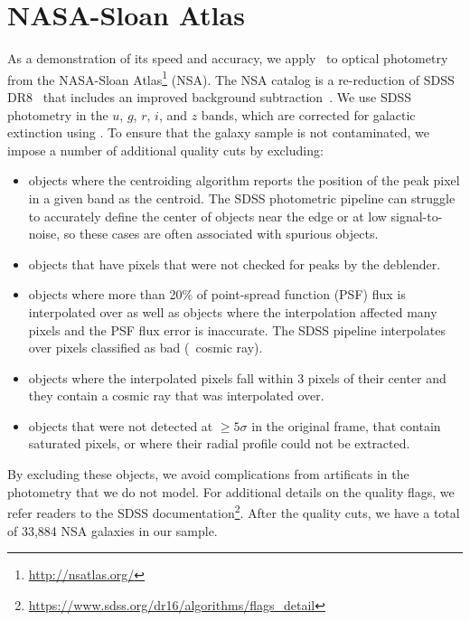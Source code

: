 \section{NASA-Sloan Atlas} \label{sec:obs}
As a demonstration of its speed and accuracy, we apply \sedflow~to optical
photometry from the NASA-Sloan Atlas\footnote{\url{http://nsatlas.org/}} (NSA).
The NSA catalog is a re-reduction of SDSS DR8~\citep{aihara2011} that includes
an improved background subtraction~\citep{blanton2011}.
We use SDSS photometry in the $u$, $g$, $r$, $i$, and $z$ bands, which are
corrected for galactic extinction using \cite{schlegel1998}.
To ensure that the galaxy sample is not contaminated, we impose a number of
additional quality cuts by excluding:
\begin{itemize}
    \item objects where the centroiding algorithm reports the
    position of the peak pixel in a given band as the centroid. 
    The SDSS photometric pipeline can struggle to accurately define the center
    of objects near the edge or at low signal-to-noise, so these cases are
    often associated with spurious objects. 
    \item objects that have pixels that were not checked for peaks by the
    deblender. 
    \item objects where more than 20\% of point-spread function (PSF) flux is
    interpolated over as well as objects where the interpolation affected many
    pixels and the PSF flux error is inaccurate. 
    The SDSS pipeline interpolates over pixels classified as bad (\eg~cosmic
    ray).
    \item objects where the interpolated pixels fall within 3 pixels of their
    center and they contain a cosmic ray that was interpolated over.
    \item objects that were not detected at $\ge5\sigma$ in the original frame,
    that contain saturated pixels, or where their radial profile could not be
    extracted.
\end{itemize}
By excluding these objects, we avoid complications from artificats in the
photometry that we do not model. 
For additional details on the quality flags, we refer readers to the SDSS
documentation\footnote{\url{https://www.sdss.org/dr16/algorithms/flags_detail}}.
After the quality cuts, we have a total of 33,884 NSA galaxies in our sample.

